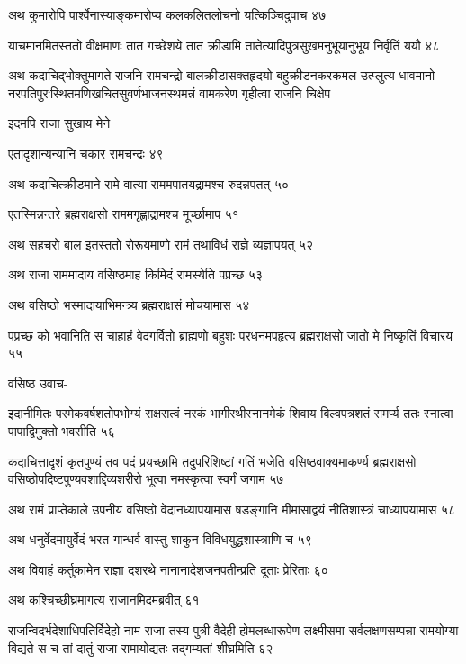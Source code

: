 अथ कुमारोपि पार्श्वेनास्याङ्कमारोप्य कलकलितलोचनो यत्किञ्चिदुवाच ४७

याचमानमितस्ततो वीक्षमाणः तात गच्छेशये तात क्रीडामि तातेत्यादिपुत्रसुखमनुभूयानुभूय
निर्वृतिं ययौ ४८

अथ कदाचिद्भोक्तुमागते राजनि रामचन्द्रो बालक्रीडासक्तहृदयो बहुक्रीडनकरकमल उत्प्लुत्य
धावमानो नरपतिपुरःस्थितमणिखचितसुवर्णभाजनस्थमन्नं वामकरेण गृहीत्वा राजनि चिक्षेप

इदमपि राजा सुखाय मेने

एतादृशान्यन्यानि चकार रामचन्द्रः ४९

अथ कदाचित्क्रीडमाने रामे वात्या राममपातयद्रामश्च रुदन्नपतत् ५०

एतस्मिन्नन्तरे ब्रह्मराक्षसो राममगृह्णाद्रामश्च मूर्च्छामाप ५१

अथ सहचरो बाल इतस्ततो रोरूयमाणो रामं तथाविधं राज्ञे व्यज्ञापयत् ५२

अथ राजा राममादाय वसिष्ठमाह किमिदं रामस्येति पप्रच्छ ५३

अथ वसिष्ठो भस्मादायाभिमन्त्र्य ब्रह्मराक्षसं मोचयामास ५४

पप्रच्छ को भवानिति स चाहाहं वेदगर्वितो ब्राह्मणो बहुशः परधनमपहृत्य ब्रह्मराक्षसो जातो
मे निष्कृतिं विचारय ५५

वसिष्ठ उवाच-

इदानीमितः परमेकवर्षशतोपभोग्यं राक्षसत्वं नरकं भागीरथीस्नानमेकं शिवाय बिल्वपत्रशतं
समर्प्य ततः स्नात्वा पापाद्विमुक्तो भवसीति ५६

कदाचित्तादृशं कृतपुण्यं तव पदं प्रयच्छामि तदुपरिशिष्टां गतिं भजेति वसिष्ठवाक्यमाकर्ण्य
ब्रह्मराक्षसो वसिष्ठोपदिष्टपुण्यवशाद्दिव्यशरीरो भूत्वा नमस्कृत्वा स्वर्गं जगाम ५७

अथ रामं प्राप्तेकाले उपनीय वसिष्ठो वेदानध्यापयामास षडङ्गानि मीमांसाद्वयं नीतिशास्त्रं
चाध्यापयामास ५८

अथ धनुर्वेदमायुर्वेदं भरत गान्धर्व वास्तु शाकुन विविधयुद्धशास्त्राणि च ५९

अथ विवाहं कर्तुकामेन राज्ञा दशरथे नानानादेशजनपतीन्प्रति दूताः प्रेरिताः ६०

अथ कश्चिच्छीघ्रमागत्य राजानमिदमब्रवीत् ६१

राजन्विदर्भदेशाधिपतिर्विदेहो नाम राजा तस्य पुत्री वैदेही होमलब्धारूपेण लक्ष्मीसमा
सर्वलक्षणसम्पन्ना रामयोग्या विद्यते स च तां दातुं राजा रामायोद्यतः तद्गम्यतां शीघ्रमिति
 ६२

